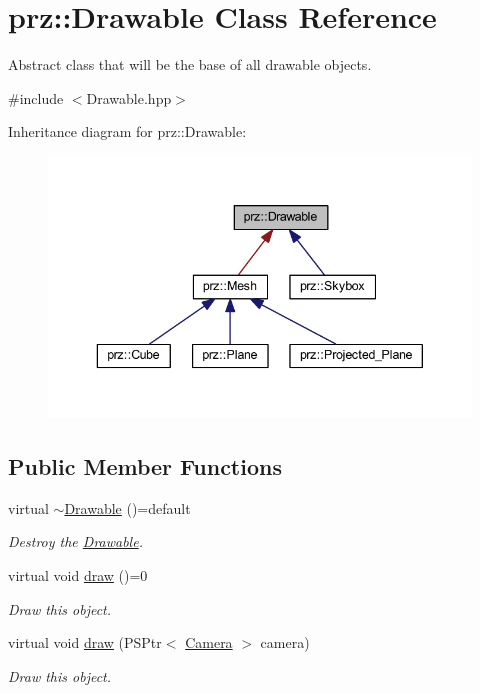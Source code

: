 \hypertarget{classprz_1_1_drawable}{}\section{prz\+::Drawable Class Reference}
\label{classprz_1_1_drawable}


Abstract class that will be the base of all drawable objects.  




{\ttfamily \#include $<$Drawable.\+hpp$>$}



Inheritance diagram for prz\+::Drawable\+:
\nopagebreak
\begin{figure}[H]
\begin{center}
\leavevmode
\includegraphics[width=343pt]{classprz_1_1_drawable__inherit__graph}
\end{center}
\end{figure}
\subsection*{Public Member Functions}
\begin{DoxyCompactItemize}
\item 
virtual \mbox{\hyperlink{classprz_1_1_drawable_a6fbba7cb0aae98e2b777e86897c3512b}{$\sim$\+Drawable}} ()=default
\begin{DoxyCompactList}\small\item\em Destroy the \mbox{\hyperlink{classprz_1_1_drawable}{Drawable}}. \end{DoxyCompactList}\item 
virtual void \mbox{\hyperlink{classprz_1_1_drawable_aa6ca0ce45d4a00b69ecf47d5deb23825}{draw}} ()=0
\begin{DoxyCompactList}\small\item\em Draw this object. \end{DoxyCompactList}\item 
virtual void \mbox{\hyperlink{classprz_1_1_drawable_ab82bbd8a27416a49efcef7fa11b59b89}{draw}} (P\+S\+Ptr$<$ \mbox{\hyperlink{classprz_1_1_camera}{Camera}} $>$ camera)
\begin{DoxyCompactList}\small\item\em Draw this object. \end{DoxyCompactList}\end{DoxyCompactItemize}


